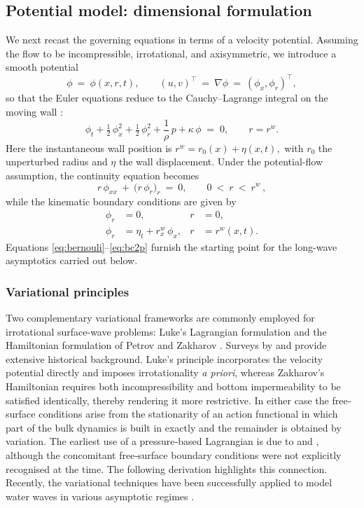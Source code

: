 \documentclass[alpha-refs, 12pt]{wiley-article}
\begin{document}
\subsection{Potential model: dimensional formulation}

We next recast the governing equations in terms of a velocity potential. Assuming the flow to be incompressible, irrotational, and axisymmetric, we introduce a smooth potential
\[
  \phi\ =\ \phi(x,r,t),\qquad
  (u,v)^{\top}\ =\ \nabla\phi\ =\ (\phi_{x},\phi_{r})^{\top},
\]
so that the Euler equations reduce to the Cauchy--Lagrange integral on the moving wall \citep{Mitsotakis2019}:
\begin{equation}\label{eq:bernouli}
  \phi_{t}
  +\tfrac{1}{2}\,\phi_{x}^{2}
  +\tfrac{1}{2}\,\phi_{r}^{2}
  +\frac{1}{\rho}\,p
  +\kappa\,\phi
  \;=\;0,
  \qquad
  r=r^{w}.
\end{equation}
Here the instantaneous wall position is
\(
  r^{w}=r_{0}(x)+\eta(x,t),
\)
with $r_{0}$ the unperturbed radius and $\eta$ the wall displacement. Under the potential-flow assumption, the continuity equation becomes
\begin{equation}\label{eq:massp}
  r\,\phi_{xx}\ +\ \bigl(r\,\phi_{r}\bigr)_{r}\ =\ 0, \qquad 0\ <\ r\ <\ r^{w}\,,
\end{equation}
while the kinematic boundary conditions are given by
\begin{align}
  \phi_{r}&=0,
  & r&=0, \label{eq:bc1p}\\[2pt]
  \phi_{r}&=\eta_{t}+r^{w}_{x}\,\phi_{x},
  & r&=r^{w}(x,t).\label{eq:bc2p}
\end{align}
Equations \eqref{eq:bernouli}--\eqref{eq:bc2p} furnish the starting point for the long-wave asymptotics carried out below.

\subsubsection{Variational principles}
\label{sec:var_principles}

Two complementary variational frameworks are commonly employed for irrotational surface-wave problems: Luke's Lagrangian formulation \citep{Luke1967} and the Hamiltonian formulation of Petrov and Zakharov \citep{Petrov1964, Zakharov1968}. Surveys by \cite{Radder1999} and \cite{Zakharov1997} provide extensive historical background. Luke's principle incorporates the velocity potential directly and imposes irrotationality \emph{a priori}, whereas Zakharov's Hamiltonian requires both incompressibility and bottom impermeability to be satisfied identically, thereby rendering it more restrictive. In either case the free‐surface conditions arise from the stationarity of an action functional in which part of the bulk dynamics is built in exactly and the remainder is obtained by variation. The earliest use of a pressure‐based Lagrangian is due to \cite{Clebsch1859} and \cite{Hargreaves1908}, although the concomitant free‐surface boundary conditions were not explicitly recognised at the time. The following derivation highlights this connection. Recently, the variational techniques have been successfully applied to model water waves in various asymptotic regimes \citep{Clamond2009,Clamond2024}.
\end{document}

